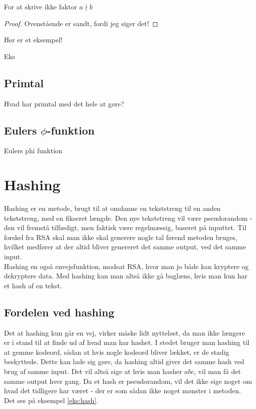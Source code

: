 \documentclass[a4paper, 12pt]{article}
\begin{document}
    \begin{definition}
        For at skrive ikke faktor \(a \nmid b\)
    \end{definition}


    \begin{proof}
        Ovenstående er sandt, fordi jeg siger det!
    \end{proof}

    \begin{eks}
        Her er et eksempel!


        \caption{Eks}
    \end{eks}




    \subsection{Primtal}
    Hvad har primtal med det hele at gøre?

    \subsection{Eulers \texorpdfstring{\(\phi\)}{Lg}-funktion}
    Eulers phi funktion


\newpage
\section{Hashing}
Hashing er en metode, brugt til at omdanne en tekststreng til en anden tekststreng, med en fikseret længde.
Den nye tekststreng vil være pseudorandom - den vil fremstå tilfædigt, men faktisk være regelmæssig, baseret på inputtet.
Til forskel fra RSA skal man ikke skal generere nogle tal førend metoden bruges, hvilket medfører at der altid bliver genereret det samme output, ved det samme input.
\\
Hashing en også envejsfunktion, modsat RSA, hvor man jo både kan kryptere og dekryptere data.
Med hashing kan man altså ikke gå baglæns, hvis man kun har et hash af en tekst.


    \subsection{Fordelen ved hashing}
    Det at hashing kun går en vej, virker måske lidt nytteløst, da man ikke længere er i stand til at finde ud af hvad man har hashet.
    I stedet bruger man hashing til at gemme kodeord, sådan at hvis nogle kodeord bliver lækket, er de stadig beskyttede.
    Dette kan lade sig gøre, da hashing altid giver det samme hash ved brug af samme input.
    Det vil altså sige at hvis man hasher \(abc\), vil man få det samme output hver gang.
    Da et hash er pseudorandom, vil det ikke sige noget om hvad det tidligere har været - der er som sådan ikke noget mønster i metoden.
    Det ses på eksempel \autoref{eks:hash}.
\end{document}
